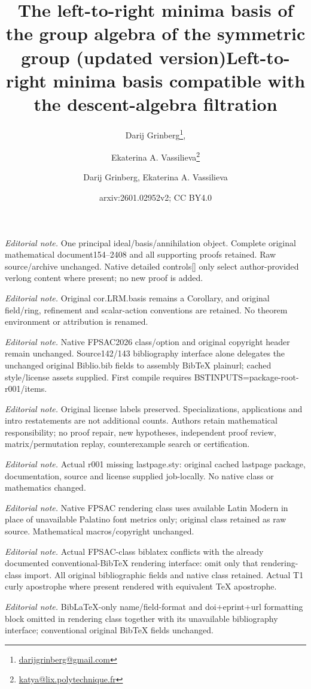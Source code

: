 \documentclass[submission]{FPSAC2026}
\title[The left-to-right minima basis]{The left-to-right minima basis of the group algebra of the symmetric group (updated version)}
\author[D. Grinberg \and E.A. Vassilieva]{Darij Grinberg\thanks{\href{mailto:darijgrinberg@gmail.com}{darijgrinberg@gmail.com}}\addressmark{1}, \and Ekaterina A. Vassilieva\thanks{\href{mailto:katya@lix.polytechnique.fr}{katya@lix.polytechnique.fr}}\addressmark{2}}
\title{Left-to-right minima basis compatible with the descent-algebra filtration}
\author{Darij Grinberg, Ekaterina A. Vassilieva}
\date{arxiv:2601.02952v2; CC BY4.0}
\begin{document}
\maketitle
\noindent\textit{Editorial note.} One principal ideal/basis/annihilation object. Complete original mathematical document154--2408 and all supporting proofs retained. Raw source/archive unchanged. Native detailed controls[] only select author-provided verlong content where present; no new proof is added.\par\medskip
\noindent\textit{Editorial note.} Original cor.LRM.basis remains a Corollary, and original field/ring, refinement and scalar-action conventions are retained. No theorem environment or attribution is renamed.\par\medskip
\noindent\textit{Editorial note.} Native FPSAC2026 class/option and original copyright header remain unchanged. Source142/143 bibliography interface alone delegates the unchanged original Biblio.bib fields to assembly BibTeX plainurl; cached style/license assets supplied. First compile requires BSTINPUTS=package-root-r001/items.\par\medskip
\noindent\textit{Editorial note.} Original license labels preserved. Specializations, applications and intro restatements are not additional counts. Authors retain mathematical responsibility; no proof repair, new hypotheses, independent proof review, matrix/permutation replay, counterexample search or certification.\par\medskip
\noindent\textit{Editorial note.} Actual r001 missing lastpage.sty: original cached lastpage package, documentation, source and license supplied job-locally. No native class or mathematics changed.\par\medskip
\noindent\textit{Editorial note.} Native FPSAC rendering class uses available Latin Modern in place of unavailable Palatino font metrics only; original class retained as raw source. Mathematical macros/copyright unchanged.\par\medskip
\noindent\textit{Editorial note.} Actual FPSAC-class biblatex conflicts with the already documented conventional-BibTeX rendering interface: omit only that rendering-class import. All original bibliographic fields and native class retained. Actual T1 curly apostrophe where present rendered with equivalent TeX apostrophe.\par\medskip
\noindent\textit{Editorial note.} BibLaTeX-only name/field-format and doi+eprint+url formatting block omitted in rendering class together with its unavailable bibliography interface; conventional original BibTeX fields unchanged.\par\medskip
\end{document}

